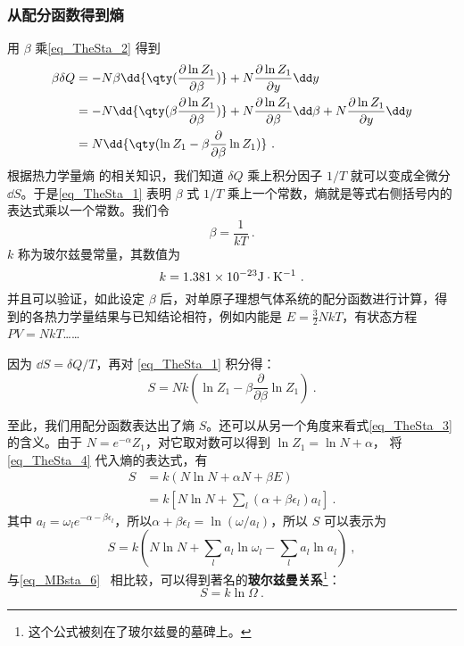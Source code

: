 \subsubsection{从配分函数得到熵}
用 $\beta$ 乘\autoref{eq_TheSta_2} 得到
\begin{equation}\label{eq_TheSta_1}
\begin{aligned}
\beta \delta Q&=-N\beta\dd{\qty(\frac{\partial \ln Z_1}{\partial \beta})}+N\frac{\partial \ln Z_1}{\partial y}\dd y\\
&=-N\dd{\qty(\beta\frac{\partial \ln Z_1}{\partial \beta})}+N\frac{\partial \ln Z_1}{\partial \beta}\dd \beta+N\frac{\partial \ln Z_1}{\partial y}\dd y\\
&=N\dd{\qty(\ln Z_1-\beta\frac{\partial }{\partial \beta}\ln Z_1)}~.
\end{aligned}
\end{equation}
根据热力学量熵 的相关知识，我们知道 $\delta Q$ 乘上积分因子 $1/T$ 就可以变成全微分 $\dd S$。于是\autoref{eq_TheSta_1} 表明 $\beta$ 式 $1/T$ 乘上一个常数，熵就是等式右侧括号内的表达式乘以一个常数。我们令
\begin{equation}
\beta=\frac{1}{kT}~.
\end{equation}
$k$ 称为玻尔兹曼常量，其数值为
\begin{equation}
k=1.381\times 10^{-23} \rm{J\cdot K^{-1}}~.
\end{equation}
并且可以验证，如此设定 $\beta$ 后，对单原子理想气体系统的配分函数进行计算，得到的各热力学量结果与已知结论相符，例如内能是 $E=\frac{3}{2}NkT$，有状态方程 $PV=NkT$…… 

因为 $\dd S=\delta Q/T$，再对 \autoref{eq_TheSta_1} 积分得：
\begin{equation}\label{eq_TheSta_3}
S=Nk(\ln Z_1-\beta\frac{\partial }{\partial \beta}\ln Z_1)~.
\end{equation}

至此，我们用配分函数表达出了熵 $S$。还可以从另一个角度来看式\autoref{eq_TheSta_3} 的含义。由于 $N=e^{-\alpha}Z_1$，对它取对数可以得到 $\ln Z_1=\ln N+\alpha$，
将\autoref{eq_TheSta_4} 代入熵的表达式，有
\begin{equation}
\begin{aligned}
S&=k(N\ln N+\alpha N+\beta E)
\\&=k[N\ln N+\sum_l(\alpha+\beta\epsilon_l)a_l]~.
\end{aligned}
\end{equation}
其中 $a_l=\omega_le^{-\alpha-\beta\epsilon_l}$，所以$\alpha+\beta\epsilon_l=\ln(\omega/a_l)$，所以 $S$ 可以表示为
\begin{equation}
S=k(N\ln N+\sum_l a_l\ln\omega_l-\sum_l a_l\ln a_l)~,
\end{equation}
与\autoref{eq_MBsta_6}~ 相比较，可以得到著名的\textbf{玻尔兹曼关系}\footnote{这个公式被刻在了玻尔兹曼的墓碑上。}：
\begin{equation}\label{eq_TheSta_7}
S=k\ln \Omega~.
\end{equation}
